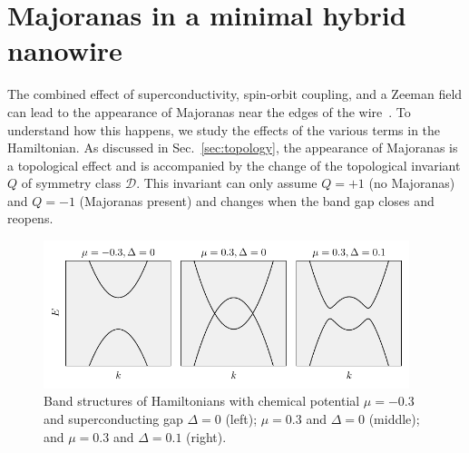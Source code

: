 

\section{Majoranas in a minimal hybrid nanowire}\label{sec:minimal_majoranas}
The combined effect of superconductivity, spin-orbit coupling, and a Zeeman field can lead to the appearance of Majoranas near the edges of the wire~\cite{Lutchyn2010,Oreg2010}.
To understand how this happens, we study the effects of the various terms in the Hamiltonian.
As discussed in Sec.~\ref{sec:topology}, the appearance of Majoranas is a topological effect and is accompanied by the change of the topological invariant $Q$ of symmetry class $\mathcal{D}$.
This invariant can only assume $Q=+1$ (no Majoranas) and $Q=-1$ (Majoranas present) and changes when the band gap closes and reopens.

\begin{figure}
\begin{center}
\includegraphics[width=0.95\textwidth]{chapter_introduction/figures/triv_topo_bandstructure.pdf}
\caption{Band structures of Hamiltonians with chemical potential $\mu=-0.3$ and superconducting gap $\Delta=0$ (left); $\mu=0.3$ and $\Delta=0$ (middle); and $\mu=0.3$ and $\Delta=0.1$ (right).
\label{fig:triv_topo_bandstructure}}
\end{center}
\end{figure}

